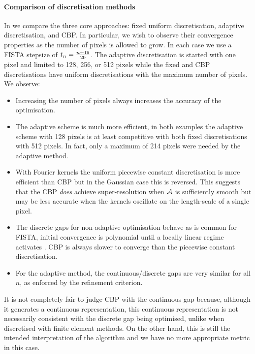 \documentclass[10pt,a4paper,onecolumn]{article}
\numberwithin{equation}{section}
\newcommand*{\vart}[1]{%
	\IfEqCase{#1}{%
		{0}{s}%
		{1}{t}%
	}[t#1]%
}
\begin{document}
\paragraph{Comparison of discretisation methods}
In  we compare the three core approaches: fixed uniform
discretisation, adaptive discretisation, and CBP. In particular, we wish to observe their convergence properties as the number of pixels is allowed to grow. In each case we use a FISTA stepsize of $\vart1_n = \frac{n+19}{20}$. The adaptive discretisation is started with one pixel and limited to 128, 256, or 512 pixels while the fixed and CBP discretisations have uniform discretisations with the maximum number of pixels. We observe:
\begin{itemize}
	\item Increasing the number of pixels always increases the accuracy of the optimisation.
	\item The adaptive scheme is much more efficient, in both examples the adaptive scheme with 128 pixels is at least competitive with both fixed discretisations with 512 pixels. In fact, only a maximum of 214 pixels were needed by the adaptive method.
	\item With Fourier kernels the uniform piecewise constant discretisation is more efficient than CBP but in the Gaussian case this is reversed. This suggests that the CBP \emph{does} achieve super-resolution when $\mathcal{A}$ is sufficiently smooth but may be less accurate when the kernels oscillate on the length-scale of a single pixel.
	\item The discrete gaps for non-adaptive optimisation behave as is common for FISTA, initial convergence is polynomial until a locally linear regime activates \cite{Tao2016}. CBP is always slower to converge than the piecewise constant discretisation.
	\item For the adaptive method, the continuous/discrete gaps are very similar for all $n$, as enforced by the refinement criterion.
\end{itemize}
It is not completely fair to judge CBP with the continuous gap because, although it generates a continuous representation, this continuous representation is not necessarily consistent with the discrete gap being optimised, unlike when discretised with finite element methods. On the other hand, this is still the intended interpretation of the algorithm and we have no more appropriate metric in this case.
\end{document}
